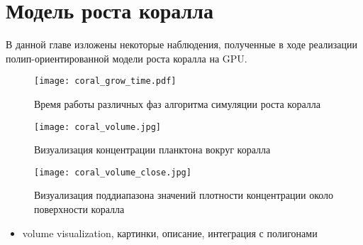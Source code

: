 \chapter{Модель роста коралла}

В данной главе изложены некоторые наблюдения, полученные в ходе реализации полип-ориентированной модели роста коралла на GPU. 

\begin{figure}[h]
\center
\texttt{[image: coral\_grow\_time.pdf]}
\caption{Время работы различных фаз алгоритма симуляции роста коралла}
\label{fig:coral_grow_time}
\end{figure}


\begin{figure}[h]
\center
\texttt{[image: coral\_volume.jpg]}
\caption{Визуализация концентрации планктона вокруг коралла}
\label{fig:coral_volume}
\end{figure}

\begin{figure}[h]
\center
\texttt{[image: coral\_volume\_close.jpg]}
\caption{Визуализация поддиапазона значений плотности концентрации около поверхности коралла}
\label{fig:coral_volume_close}
\end{figure}


\begin{itemize}
  \item volume visualization, картинки, описание, интеграция с полигонами
\end{itemize}

